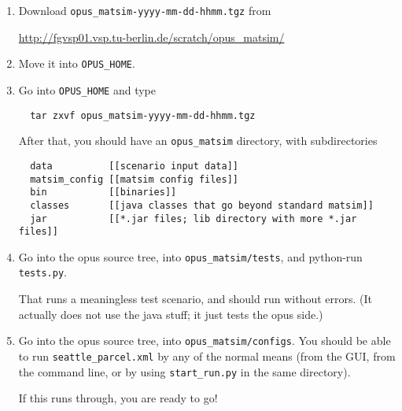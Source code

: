 \documentclass{article}
\begin{document}
\begin{enumerate}

\item Download \verb#opus_matsim-yyyy-mm-dd-hhmm.tgz# from

\url{http://fgvsp01.vsp.tu-berlin.de/scratch/opus_matsim/}

\item Move it into \verb#OPUS_HOME#.

\item Go into \verb#OPUS_HOME# and type
\begin{verbatim}
  tar zxvf opus_matsim-yyyy-mm-dd-hhmm.tgz
\end{verbatim}

After that, you should have an \verb$opus_matsim$ directory, with
subdirectories
\begin{verbatim}
  data          [[scenario input data]]
  matsim_config [[matsim config files]]
  bin           [[binaries]]
  classes       [[java classes that go beyond standard matsim]]
  jar           [[*.jar files; lib directory with more *.jar files]]
\end{verbatim}

% 

\item Go into the opus source tree, into \verb$opus_matsim/tests$, and
python-run \verb$tests.py$.

That runs a meaningless test scenario, and should run without errors.
(It actually does not use the java stuff; it just tests the opus side.)

\item Go into the opus source tree, into \verb$opus_matsim/configs$.
You should be able to run \verb$seattle_parcel.xml$ by any of the
normal means (from the GUI, from the command line, or by using
\verb$start_run.py$ in the same directory).

If this runs through, you are ready to go!

\end{enumerate}
\end{document}
